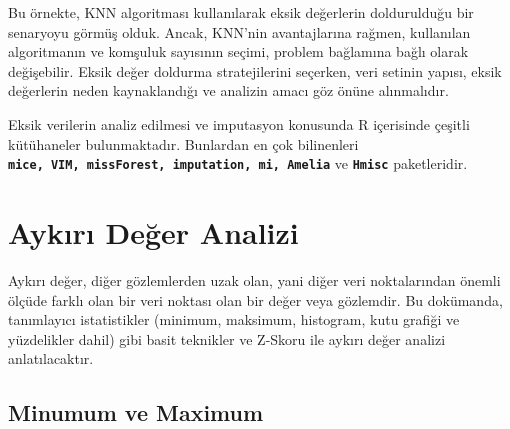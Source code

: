 \documentclass[
  letterpaper,
  DIV=11,
  numbers=noendperiod]{scrreprt}
\newenvironment{Shaded}{\begin{snugshade}}{\end{snugshade}}
\newcommand{\CommentTok}[1]{\textcolor[rgb]{0.37,0.37,0.37}{#1}}
\newcommand{\FunctionTok}[1]{\textcolor[rgb]{0.28,0.35,0.67}{#1}}
\newcommand{\NormalTok}[1]{\textcolor[rgb]{0.00,0.23,0.31}{#1}}
\newcommand{\SpecialCharTok}[1]{\textcolor[rgb]{0.37,0.37,0.37}{#1}}
\begin{document}
Bu örnekte, KNN algoritması kullanılarak eksik değerlerin doldurulduğu
bir senaryoyu görmüş olduk. Ancak, KNN'nin avantajlarına rağmen,
kullanılan algoritmanın ve komşuluk sayısının seçimi, problem bağlamına
bağlı olarak değişebilir. Eksik değer doldurma stratejilerini seçerken,
veri setinin yapısı, eksik değerlerin neden kaynaklandığı ve analizin
amacı göz önüne alınmalıdır.

\begin{tcolorbox}[enhanced jigsaw, colback=white, coltitle=black, colbacktitle=quarto-callout-tip-color!10!white, opacitybacktitle=0.6, opacityback=0, toprule=.15mm, bottomrule=.15mm, bottomtitle=1mm, rightrule=.15mm, breakable, arc=.35mm, colframe=quarto-callout-tip-color-frame, titlerule=0mm, left=2mm, leftrule=.75mm, toptitle=1mm, title=\textcolor{quarto-callout-tip-color}{\faLightbulb}\hspace{0.5em}{Tavsiye}]

Eksik verilerin analiz edilmesi ve imputasyon konusunda R içerisinde
çeşitli kütühaneler bulunmaktadır. Bunlardan en çok bilinenleri
\textbf{\texttt{mice,\ VIM,\ missForest,\ imputation,\ mi,\ Amelia}} ve
\textbf{\texttt{Hmisc}} paketleridir.

\end{tcolorbox}

\section*{Aykırı Değer Analizi}\label{aykux131rux131-deux11fer-analizi}


Aykırı değer, diğer gözlemlerden uzak olan, yani diğer veri
noktalarından önemli ölçüde farklı olan bir veri noktası olan bir değer
veya gözlemdir. Bu dokümanda, tanımlayıcı istatistikler (minimum,
maksimum, histogram, kutu grafiği ve yüzdelikler dahil) gibi basit
teknikler ve Z-Skoru ile aykırı değer analizi anlatılacaktır.

\subsection*{Minumum ve Maximum}\label{minumum-ve-maximum}

\begin{Shaded}
\end{Shaded}
\end{document}
